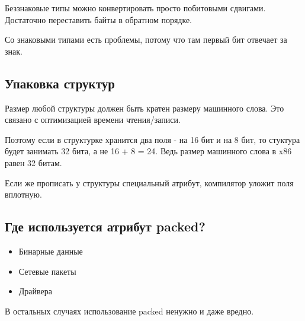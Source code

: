 Беззнаковые типы можно конвертировать просто побитовыми сдвигами. Достаточно переставить байты в обратном порядке.

Со знаковыми типами есть проблемы, потому что там первый бит отвечает за знак.

\subsection{Упаковка структур}

Размер любой структуры должен быть кратен размеру машинного слова. Это связано с оптимизацией времени чтения/записи. 

Поэтому если в структурке хранится два поля - на 16 бит и на 8 бит, то стуктура будет занимать 32 бита, а не 16 + 8 = 24. Ведь размер машинного слова в x86 равен 32 битам.

Если же прописать у структуры специальный атрибут, компилятор уложит поля вплотную.

\subsection{Где используется атрибут packed?}

\begin{itemize}
	\item Бинарные данные
	\item Сетевые пакеты
	\item Драйвера
\end{itemize}

В остальных случаях использование packed ненужно и даже вредно.
